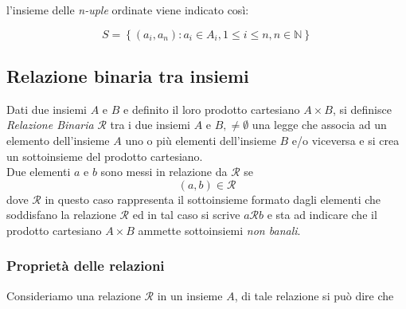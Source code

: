 \documentclass[a4paper]{article}
\newcommand{\Ne}{\mathbb{N}}
\newcommand{\R}{\mathcal{R}}
\begin{document}
l'insieme delle \textit{n-uple} ordinate viene indicato così:

\begin{equation*}
	S=\left\lbrace (a_i, a_n):a_i \in A_i, 1\leq i \leq n, n \in \Ne\right\rbrace 
\end{equation*}
\subsection[Relazione binaria]{Relazione binaria tra insiemi}
Dati due insiemi $A$ e $B$ e definito il loro prodotto cartesiano $A \times B$, si definisce \textit{Relazione Binaria} $\mathcal{R}$ tra i due insiemi $A$ e $B, \neq \emptyset$ una legge che associa ad un elemento dell'insieme $A$ uno o più elementi dell'insieme $B$ e/o viceversa e si crea un sottoinsieme del prodotto cartesiano.\\
Due elementi $a$ e $b$ sono messi in relazione da $\mathcal{R}$ se
\begin{equation*}
	(a,b) \in \mathcal{R}
\end{equation*}
dove $\R$ in questo caso rappresenta il sottoinsieme formato dagli elementi che soddisfano la relazione $\R$ ed in tal caso si scrive $a\mathcal{R} b$ e sta ad indicare che il prodotto cartesiano $A \times B$ ammette sottoinsiemi \textit{non banali}.



\subsubsection{Proprietà delle relazioni}
Consideriamo una relazione $\R$ in un insieme $A$, di tale relazione si può dire che
\end{document}
